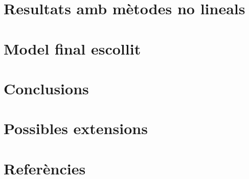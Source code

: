 \documentclass[a4paper]{article}
\begin{document}
\section{Resultats amb mètodes no lineals}
\section{Model final escollit}
\section{Conclusions}
\section{Possibles extensions}
\section{Referències}



\end{document}
